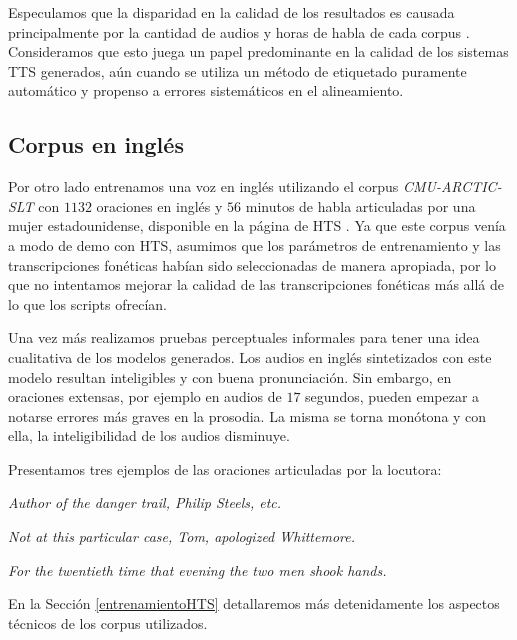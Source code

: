 
Especulamos que la disparidad en la calidad de los resultados es causada principalmente por la cantidad de audios y horas de habla de cada corpus \cite{phoneticAndProsodic}. Consideramos que esto juega un papel predominante en la calidad de los sistemas TTS generados, aún cuando se utiliza un método de etiquetado puramente automático y propenso a errores sistemáticos en el alineamiento.


\subsection{Corpus en inglés}

Por otro lado entrenamos una voz en inglés utilizando el corpus \textit{CMU-ARCTIC-SLT} \cite{cmuArtic} con $1132$ oraciones en inglés y $56$ minutos de habla articuladas por una mujer estadounidense, disponible en la página de HTS \cite{hts}. Ya que este corpus venía a modo de demo con HTS, asumimos que los parámetros de entrenamiento y las transcripciones fonéticas habían sido seleccionadas de manera apropiada, por lo que no intentamos mejorar la calidad de las transcripciones fonéticas más allá de lo que los scripts ofrecían. 

Una vez más realizamos pruebas perceptuales informales para tener una idea cualitativa de los modelos generados. Los audios en inglés sintetizados con este modelo resultan inteligibles y con buena pronunciación. Sin embargo, en oraciones extensas, por ejemplo en audios de $17$ segundos, pueden empezar a notarse errores más graves en la prosodia. La misma se torna monótona y con ella, la inteligibilidad de los audios disminuye.

Presentamos tres ejemplos de las oraciones articuladas por la locutora:

\indent\indent \textit{Author of the danger trail, Philip Steels, etc.}

\indent\indent \textit{Not at this particular case, Tom, apologized Whittemore.}

\indent\indent \textit{For the twentieth time that evening the two men shook hands.}

En la Sección \ref{entrenamientoHTS} detallaremos más detenidamente los aspectos técnicos de los corpus utilizados.

